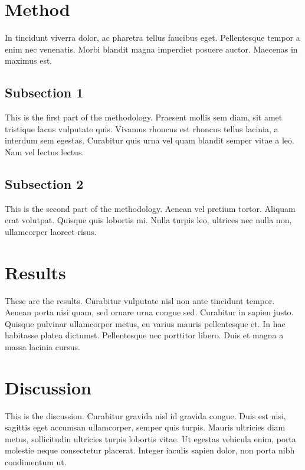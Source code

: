 \documentclass[12pt,a4paper,]{report}
\begin{document}
\section{Method}\label{method-3}

In tincidunt viverra dolor, ac pharetra tellus faucibus eget.
Pellentesque tempor a enim nec venenatis. Morbi blandit magna imperdiet
posuere auctor. Maecenas in maximus est.

\subsection{Subsection 1}\label{subsection-1-2}

This is the first part of the methodology. Praesent mollis sem diam, sit
amet tristique lacus vulputate quis. Vivamus rhoncus est rhoncus tellus
lacinia, a interdum sem egestas. Curabitur quis urna vel quam blandit
semper vitae a leo. Nam vel lectus lectus.

\subsection{Subsection 2}\label{subsection-2-3}

This is the second part of the methodology. Aenean vel pretium tortor.
Aliquam erat volutpat. Quisque quis lobortis mi. Nulla turpis leo,
ultrices nec nulla non, ullamcorper laoreet risus.

\section{Results}\label{results-4}

These are the results. Curabitur vulputate nisl non ante tincidunt
tempor. Aenean porta nisi quam, sed ornare urna congue sed. Curabitur in
sapien justo. Quisque pulvinar ullamcorper metus, eu varius mauris
pellentesque et. In hac habitasse platea dictumst. Pellentesque nec
porttitor libero. Duis et magna a massa lacinia cursus.

\section{Discussion}\label{discussion-4}

This is the discussion. Curabitur gravida nisl id gravida congue. Duis
est nisi, sagittis eget accumsan ullamcorper, semper quis turpis. Mauris
ultricies diam metus, sollicitudin ultricies turpis lobortis vitae. Ut
egestas vehicula enim, porta molestie neque consectetur placerat.
Integer iaculis sapien dolor, non porta nibh condimentum ut.
\end{document}
